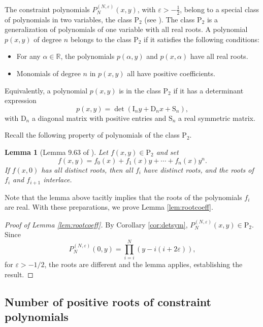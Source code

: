 \documentclass[11pt]{article}
\numberwithin{equation}{section}
\newcommand{\R}{\mathbb{R}} %
\newcommand{\e}{\varepsilon}
\newcommand{\cp}[2]{P^{(#1)}_{#2}} %
\newcommand{\MatSymbol}[1]{\bm{\mathrm{#1}}}
\newcommand{\mD}{\MatSymbol{D}}
\newcommand{\mI}{\MatSymbol{I}}
\newcommand{\mS}{\MatSymbol{S}}
\newcommand{\Ptwo}{\bm{\mathrm{P}}_2}
\theoremstyle{plain}
\newtheorem{lem}[thm]{Lemma}
\theoremstyle{definition}
\theoremstyle{remark}
\begin{document}
The constraint polynomials \(\cp{N,\e}{N}(x,y) \), with \(\e > -\frac{1}{2}\), belong to a special class of polynomials in two
variables, the class \(\Ptwo\) (see \cite{F2008}). The class \(\Ptwo\) is a generalization of polynomials of one variable with
all real roots. A polynomial \(p(x,y)\) of degree \(n\) belongs to the class \(\Ptwo\) if it satisfies the following conditions:

\begin{itemize}
\item For any \( \alpha \in \R \), the polynomials  \(p(\alpha,y)\) and \(p(x,\alpha)\) have
  all real roots.
\item Monomials of degree \(n\) in \(p(x,y)\) all have positive coefficients.
\end{itemize}
Equivalently, a polynomial \(p(x,y)\) is in the class  \( \Ptwo \) if it has a determinant expression
\[
  p(x,y) = \det\left( \mI_n y + \mD_n x + \mS_n \right),
\]
with \(\mD_n\) a diagonal matrix with positive entries and \(\mS_n\) a real symmetric matrix.

Recall the following property of polynomials of the class \(\Ptwo\).
\begin{lem}[Lemma 9.63 of \cite{F2008}]
  Let \(f(x,y) \in \Ptwo \) and set
\begin{equation*}
    f(x,y) = f_0 (x) + f_1(x) y + \cdots + f_n(x) y^n.
\end{equation*}
If \(f(x,0) \) has all distinct roots, then all \(f_i\) have distinct roots, and the roots of \(f_i \) and \(f_{i+1}\) interlace.
\end{lem}
Note that the lemma above tacitly implies that the roots of the polynomials \(f_i\) are real. With these preparations, we
prove Lemma \ref{lem:rootcoeff}.

\begin{proof}[Proof of Lemma \ref{lem:rootcoeff}]
  By Corollary \ref{cor:detsym}, \(\cp{N,\e}{N}(x,y) \in \Ptwo\).
  Since \[\cp{N,\e}{N}(0,y) = \prod_{i=i}^{N}(y-i(i+2\e)), \] for \(\e > -1/2 \), the roots
  are different and the lemma applies, establishing the result. 
\end{proof}

\subsection{Number of positive roots of constraint polynomials} \label{sec:posRoots}
\end{document}
